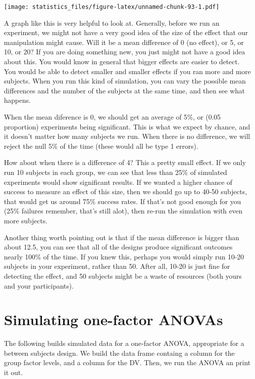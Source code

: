 \documentclass[]{book}
\begin{document}
\texttt{[image: statistics\_files/figure-latex/unnamed-chunk-93-1.pdf]}

A graph like this is very helpful to look at. Generally, before we run an experiment, we might not have a very good idea of the size of the effect that our manipulation might cause. Will it be a mean difference of 0 (no effect), or 5, or 10, or 20? If you are doing something new, you just might not have a good idea about this. You would know in general that bigger effects are easier to detect. You would be able to detect smaller and smaller effects if you ran more and more subjects. When you run this kind of simulation, you can vary the possible mean differences and the number of the subjects at the same time, and then see what happens.

When the mean diference is 0, we should get an average of 5\%, or (0.05 proportion) experiments being significant. This is what we expect by chance, and it doesn't matter how many subjects we run. When there is no difference, we will reject the null 5\% of the time (these would all be type 1 errors).

How about when there is a difference of 4? This a pretty small effect. If we only run 10 subjects in each group, we can see that less than 25\% of simulated experiments would show significant results. If we wanted a higher chance of success to measure an effect of this size, then we should go up to 40-50 subjects, that would get us around 75\% success rates. If that's not good enough for you (25\% failures remember, that's still alot), then re-run the simulation with even more subjects.

Another thing worth pointing out is that if the mean difference is bigger than about 12.5, you can see that all of the designs produce significant outcomes nearly 100\% of the time. If you knew this, perhaps you would simply run 10-20 subjects in your experiment, rather than 50. After all, 10-20 is just fine for detecting the effect, and 50 subjects might be a waste of resources (both yours and your participants).

\hypertarget{simulating-one-factor-anovas}{%
\section{Simulating one-factor ANOVAs}\label{simulating-one-factor-anovas}}

The following builds simulated data for a one-factor ANOVA, appropriate for a between subjects design. We build the data frame containg a column for the group factor levels, and a column for the DV. Then, we run the ANOVA an print it out.
\end{document}
